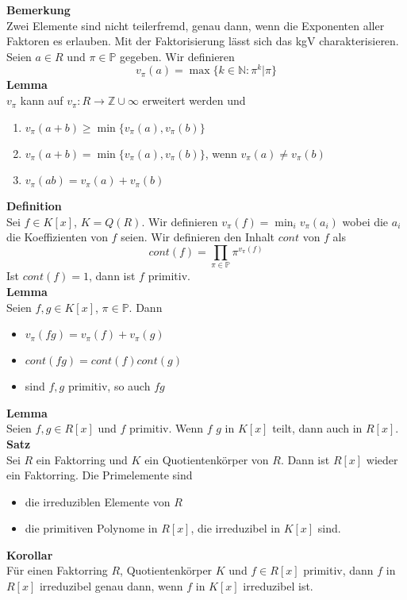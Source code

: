 \documentclass[a4paper, 12pt]{article}
\begin{document}
\noindent\textbf{Bemerkung}\\
Zwei Elemente sind nicht teilerfremd, genau dann, wenn die Exponenten aller Faktoren es erlauben. Mit der Faktorisierung lässt sich das kgV charakterisieren.\\

Seien $a \in R$ und $\pi \in \mathbb{P}$ gegeben. Wir definieren \[v_\pi(a) = \max\{k \in \mathbb{N}: \pi^k | \pi\} \]
\textbf{Lemma}\\
$v_\pi$ kann auf $v_\pi: R \to \mathbb{Z} \cup \infty $ erweitert werden und \begin{enumerate}
	\item $v_\pi(a+b) \geq \min\{v_\pi(a), v_\pi(b)\}$
	\item $v_\pi(a+b) = \min\{v_\pi(a), v_\pi(b)\}$, wenn $v_\pi(a) \neq v_\pi(b)$
	\item $v_\pi(ab) = v_\pi(a) + v_\pi(b)$
\end{enumerate} 
\textbf{Definition}\\
Sei $f \in K[x]$, $K = Q(R)$. Wir definieren $v_\pi(f) = \min_i v_\pi(a_i)$ wobei die $a_i$ die Koeffizienten von $f$ seien. Wir definieren den Inhalt $cont$ von $f$ als \[cont(f) = \prod_{\pi \in \mathbb{P}} \pi^{v_\pi(f)}\]
Ist $cont(f) = 1$, dann ist $f$ primitiv.\\
\textbf{Lemma}\\
Seien $f,g \in K[x]$, $\pi \in \mathbb{P}$. Dann \begin{itemize}
	\item $v_\pi(fg) = v_\pi(f) + v_\pi(g)$
	\item $cont(fg) = cont(f)cont(g)$
	\item sind $f,g$ primitiv, so auch $fg$
\end{itemize}
\textbf{Lemma}\\
Seien $f,g \in R[x]$ und $f$ primitiv. Wenn $f$ $g$ in $K[x]$ teilt, dann auch in $R[x]$.\\
\textbf{Satz}\\
Sei $R$ ein Faktorring und $K$ ein Quotientenkörper von $R$. Dann ist $R[x]$ wieder ein Faktorring. Die Primelemente sind \begin{itemize}
	\item die irreduziblen Elemente von $R$
	\item die primitiven Polynome in $R[x]$, die irreduzibel in $K[x]$ sind.
\end{itemize}
\textbf{Korollar}\\
Für einen Faktorring $R$, Quotientenkörper $K$ und $f \in R[x]$ primitiv, dann $f$ in $R[x]$ irreduzibel genau dann, wenn $f$ in $K[x]$ irreduzibel ist.\\
\end{document}
